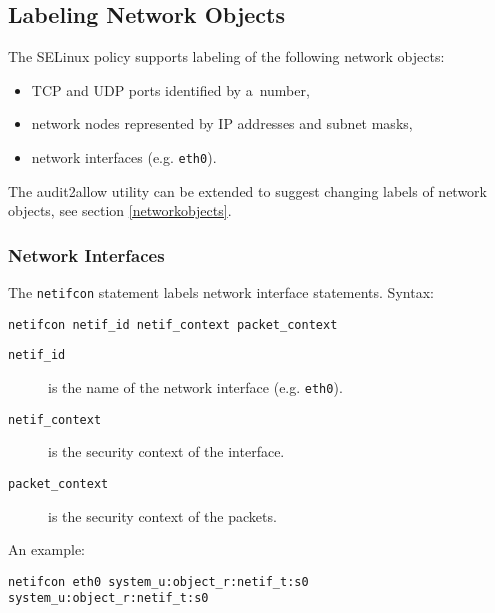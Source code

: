 \subsection{Labeling Network Objects}

The SELinux policy supports labeling of the following network objects:
\begin{itemize}
    \item TCP and UDP ports identified by a~number,
    \item network nodes represented by IP addresses and subnet masks,
    \item network interfaces (e.g. \texttt{eth0}).
\end{itemize}
The audit2allow utility can be extended to suggest changing labels of network
objects, see section \ref{networkobjects}.

\subsubsection{Network Interfaces}
The \texttt{netifcon} statement labels network interface statements. Syntax:
\begin{lstlisting}[language=te]
netifcon netif_id netif_context packet_context
\end{lstlisting}
\begin{description}
    \item [\texttt{netif\_id}] is the name of the network interface (e.g.
        \texttt{eth0}).
    \item [\texttt{netif\_context}] is the security context of the interface.
    \item [\texttt{packet\_context}] is the security context of the packets.
\end{description}
An example:
\begin{lstlisting}[language=te]
netifcon eth0 system_u:object_r:netif_t:s0 system_u:object_r:netif_t:s0
\end{lstlisting}

